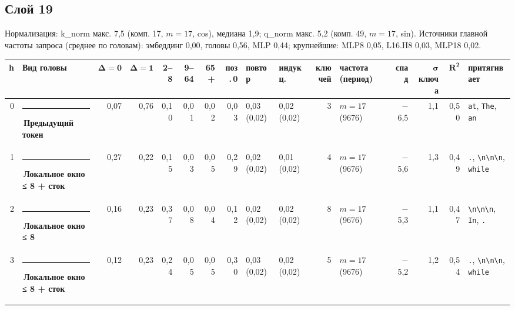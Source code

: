 \documentclass[10pt]{article}
\begin{document}
\noindent\begin{minipage}{\linewidth}
\subsection*{Слой 19}
{\small\color{ink2} Нормализация: k\_norm макс. 7,5 (комп. 17, $m{=}17$, cos), медиана 1,9; q\_norm макс. 5,2 (комп. 49, $m{=}17$, sin). Источники главной частоты запроса (среднее по головам): эмбеддинг 0,00, головы 0,56, MLP 0,44; крупнейшие: MLP8 0,05, L16.H8 0,03, MLP18 0,02.}
\begin{center}{\footnotesize\begin{tabular}{|r|l|r|r|r|r|r|r|l|l|r|l|r|r|r|l|}
\hline
\rowcolor{head}\textbf{h} & \textbf{Вид головы} & $\boldsymbol{\Delta{=}0}$ & $\boldsymbol{\Delta{=}1}$ & \textbf{2–8} & \textbf{9–64} & \textbf{65+} & \textbf{поз.\,0} & \textbf{повтор} & \textbf{индукц.} & \textbf{ключей} & \textbf{частота (период)} & \textbf{спад} & $\boldsymbol{\sigma}$ \textbf{ключа} & $\boldsymbol{R^2}$ & \textbf{притягивает} \\ \hline
0 & \textcolor[HTML]{2A78D6}{\rule{0.62em}{0.62em}}\,\textbf{Предыдущий токен} & 0,07 & 0,76 & 0,10 & 0,01 & 0,02 & 0,03 & 0,03 (0,02) & 0,02 (0,02) & 3 & $m{=}17$ (9676) & $-$6,5 & 1,1 & 0,50 & \texttt{\textvisiblespace{}at}, \texttt{\textvisiblespace{}The}, \texttt{\textvisiblespace{}an} \\ \hline
1 & \textcolor[HTML]{1BAF7A}{\rule{0.62em}{0.62em}}\,\textbf{Локальное окно ≤ 8 + сток} & 0,27 & 0,22 & 0,15 & 0,03 & 0,05 & 0,29 & 0,02 (0,02) & 0,01 (0,02) & 4 & $m{=}17$ (9676) & $-$5,6 & 1,3 & 0,49 & \texttt{\textvisiblespace{}.}, \texttt{\textvisiblespace{}\textbackslash{}n\textbackslash{}n\textbackslash{}n}, \texttt{\textvisiblespace{}while} \\ \hline
2 & \textcolor[HTML]{1BAF7A}{\rule{0.62em}{0.62em}}\,\textbf{Локальное окно ≤ 8} & 0,16 & 0,23 & 0,37 & 0,08 & 0,04 & 0,12 & 0,02 (0,02) & 0,02 (0,02) & 8 & $m{=}17$ (9676) & $-$5,3 & 1,1 & 0,47 & \texttt{\textvisiblespace{}\textbackslash{}n\textbackslash{}n\textbackslash{}n}, \texttt{\textvisiblespace{}In}, \texttt{\textvisiblespace{}.} \\ \hline
3 & \textcolor[HTML]{1BAF7A}{\rule{0.62em}{0.62em}}\,\textbf{Локальное окно ≤ 8 + сток} & 0,12 & 0,23 & 0,24 & 0,05 & 0,05 & 0,30 & 0,03 (0,02) & 0,02 (0,02) & 5 & $m{=}17$ (9676) & $-$5,2 & 1,2 & 0,54 & \texttt{\textvisiblespace{}.}, \texttt{\textvisiblespace{}\textbackslash{}n\textbackslash{}n\textbackslash{}n}, \texttt{\textvisiblespace{}while} \\ \hline

\end{tabular}}
\end{center}
\end{minipage}
\end{document}
